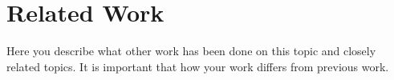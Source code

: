 \section{Related Work}
Here you describe what other work has been done on this topic and closely related topics. It is important that how your work differs from previous work.  
